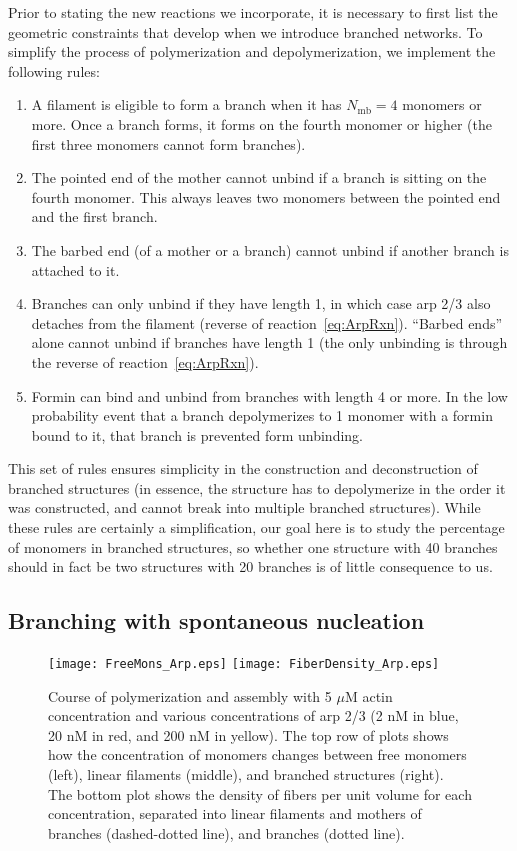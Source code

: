 \documentclass[11pt]{article}
\begin{document}
Prior to stating the new reactions we incorporate, it is necessary to first list the geometric constraints that develop when we introduce branched networks. To simplify the process of polymerization and depolymerization, we implement the following rules:
\begin{enumerate}
\item A filament is eligible to form a branch when it has $N_\text{mb}=4$ monomers or more. Once a branch forms, it forms on the fourth monomer or higher (the first three monomers cannot form branches). 
\item The pointed end of the mother cannot unbind if a branch is sitting on the fourth monomer. This always leaves two monomers between the pointed end and the first branch. 
\item The barbed end (of a mother or a branch) cannot unbind if another branch is attached to it. 
\item Branches can only unbind if they have length 1, in which case arp 2/3 also detaches from the filament (reverse of reaction\ \eqref{eq:ArpRxn}). ``Barbed ends'' alone cannot unbind if branches have length 1 (the only unbinding is through the reverse of reaction\ \eqref{eq:ArpRxn}).
\item Formin can bind and unbind from branches with length 4 or more. In the low probability event that a branch depolymerizes to 1 monomer with a formin bound to it, that branch is prevented form unbinding. 
\end{enumerate}
This set of rules ensures simplicity in the construction and deconstruction of branched structures (in essence, the structure has to depolymerize in the order it was constructed, and cannot break into multiple branched structures). While these rules are certainly a simplification, our goal here is to study the percentage of monomers in branched structures, so whether one structure with 40 branches should in fact be two structures with 20 branches is of little consequence to us. 



\subsection{Branching with spontaneous nucleation \label{sec:BrSN}}

\begin{figure}
\centering
\texttt{[image: FreeMons\_Arp.eps]}
\texttt{[image: FiberDensity\_Arp.eps]}
\caption{\label{fig:PolyDynamicsArp}Course of polymerization and assembly with 5 $\mu$M actin concentration and various concentrations of arp 2/3 (2 nM in blue, 20 nM in red, and 200 nM in yellow). The top row of plots shows how the concentration of monomers changes between free monomers (left), linear filaments (middle), and branched structures (right). The bottom plot shows the density of fibers per unit volume for each concentration, separated into linear filaments and mothers of branches (dashed-dotted line), and branches (dotted line).  }
\end{figure}
\end{document}
